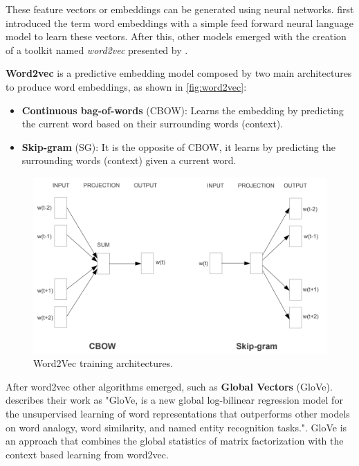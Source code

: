 These feature vectors or embeddings can be generated using neural networks.  first introduced the term word embeddings with a simple feed forward neural language model to learn these vectors. After this, other models emerged with the creation of a toolkit named \textit{word2vec} presented by .

\textbf{Word2vec} is a predictive embedding model composed by two main architectures to produce word embeddings, as shown in \autoref{fig:word2vec}:

\begin{itemize}
    \item \textbf{Continuous bag-of-words} (CBOW): Learns the embedding by predicting the current word based on their surrounding words (context).
    \item \textbf{Skip-gram} (SG): It is the opposite of CBOW, it learns by predicting the surrounding words (context) given a current word.
\end{itemize}

\begin{figure}[h]
	\caption{Word2Vec training architectures.}
	\label{fig:word2vec}
	\centering%
	\begin{minipage}{.9\textwidth}
		\includegraphics[width=\textwidth]{word2vec.png}
	\end{minipage}
\end{figure}

After word2vec other algorithms emerged, such as \textbf{Global Vectors} (GloVe).  describes their work as "GloVe, is a new global log-bilinear regression model for the unsupervised learning of word representations that outperforms other models on word analogy, word similarity, and named entity recognition tasks.". GloVe is an approach that combines the global statistics of matrix factorization with the context based learning from word2vec.

